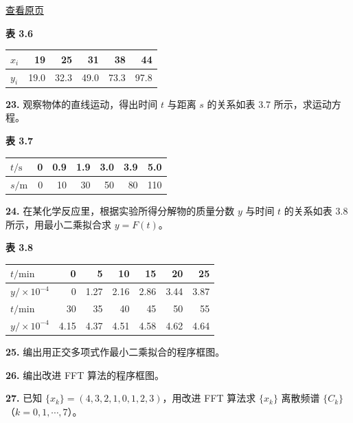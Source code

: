 \documentclass[
  10pt,
  fontset=fandol]{ctexart}
\newcounter{none} %
\begin{document}
\href{../../source-images/pdf-092.jpeg}{查看原页}

\textbf{表 3.6}

{\def\LTcaptype{none} %
\begin{longtable}[]{@{}lrrrrr@{}}
\toprule\noalign{}
\(x_i\) & 19 & 25 & 31 & 38 & 44 \\
\midrule\noalign{}
\endhead
\bottomrule\noalign{}
\endlastfoot
\(y_i\) & 19.0 & 32.3 & 49.0 & 73.3 & 97.8 \\
\end{longtable}
}

\textbf{23.} 观察物体的直线运动，得出时间 \(t\) 与距离 \(s\) 的关系如表 3.7 所示，求运动方程。

\textbf{表 3.7}

{\def\LTcaptype{none} %
\begin{longtable}[]{@{}lrrrrrr@{}}
\toprule\noalign{}
\(t/\mathrm s\) & 0 & 0.9 & 1.9 & 3.0 & 3.9 & 5.0 \\
\midrule\noalign{}
\endhead
\bottomrule\noalign{}
\endlastfoot
\(s/\mathrm m\) & 0 & 10 & 30 & 50 & 80 & 110 \\
\end{longtable}
}

\textbf{24.} 在某化学反应里，根据实验所得分解物的质量分数 \(y\) 与时间 \(t\) 的关系如表 3.8 所示，用最小二乘拟合求 \(y=F(t)\)。

\textbf{表 3.8}

{\def\LTcaptype{none} %
\begin{longtable}[]{@{}lrrrrrr@{}}
\toprule\noalign{}
\(t/\mathrm{min}\) & 0 & 5 & 10 & 15 & 20 & 25 \\
\midrule\noalign{}
\endhead
\bottomrule\noalign{}
\endlastfoot
\(y/\times10^{-4}\) & 0 & 1.27 & 2.16 & 2.86 & 3.44 & 3.87 \\
\(t/\mathrm{min}\) & 30 & 35 & 40 & 45 & 50 & 55 \\
\(y/\times10^{-4}\) & 4.15 & 4.37 & 4.51 & 4.58 & 4.62 & 4.64 \\
\end{longtable}
}

\textbf{25.} 编出用正交多项式作最小二乘拟合的程序框图。

\textbf{26.} 编出改进 FFT 算法的程序框图。

\textbf{27.} 已知 \(\{x_k\}=(4,\allowbreak 3,\allowbreak 2,\allowbreak 1,\allowbreak 0,\allowbreak 1,\allowbreak 2,\allowbreak 3)\)，用改进 FFT 算法求 \(\{x_k\}\) 离散频谱 \(\{C_k\}\)（\(k=0,1,\cdots,7\)）。
\end{document}
